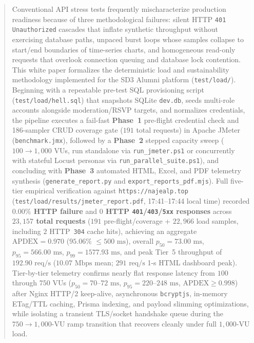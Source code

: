 \documentclass[11pt,letterpaper]{article}
\begin{document}
\begin{abstract}
\noindent Conventional API stress tests frequently mischaracterize production readiness because of three methodological failures: silent HTTP \texttt{401 Unauthorized} cascades that inflate synthetic throughput without exercising database paths, unpaced burst loops whose samples collapse to start/end boundaries of time-series charts, and homogeneous read-only requests that overlook connection queuing and database lock contention. This white paper formalizes the deterministic load and sustainability methodology implemented for the SD3 Alumni platform (\texttt{test/load/}). Beginning with a repeatable pre-test SQL provisioning script (\texttt{test/load/hell.sql}) that snapshots SQLite \texttt{dev.db}, seeds multi-role accounts alongside moderation/RSVP targets, and normalizes credentials, the pipeline executes a fail-fast \textbf{Phase~1} pre-flight credential check and 186-sampler CRUD coverage gate ($191$ total requests) in Apache JMeter (\texttt{benchmark.jmx}), followed by a \textbf{Phase~2} stepped capacity sweep ($100\to 1{,}000$ VUs, run standalone via \texttt{run\_jmeter.ps1} or concurrently with stateful Locust personas via \texttt{run\_parallel\_suite.ps1}), and concluding with \textbf{Phase~3} automated HTML, Excel, and PDF telemetry synthesis (\texttt{generate\_report.py} and \texttt{export\_reports\_pdf.mjs}). Full five-tier empirical verification against \texttt{https://najealp.top} (\texttt{test/load/results/jmeter\_report.pdf}, 17:41--17:44 local time) recorded \textbf{$0.00\%$ HTTP failure} and \textbf{$0$ HTTP \texttt{401}/\texttt{403}/\texttt{5xx} responses} across \textbf{$23{,}157$ total requests} ($191$ pre-flight/coverage + $22{,}966$ load samples, including $2$ HTTP~\texttt{304} cache hits), achieving an aggregate \textbf{$\text{APDEX} = 0.970$} ($95.06\%$ $\le 500\text{ ms}$), overall $p_{50} = 73.00\text{ ms}$, $p_{95} = 566.00\text{ ms}$, $p_{99} = 1577.93\text{ ms}$, and peak Tier~5 throughput of $192.90\text{ req/s}$ ($10.07\text{ Mbps}$ mean; $291\text{ req/s}$ 1-s HTML dashboard peak). Tier-by-tier telemetry confirms nearly flat response latency from $100$ through $750$ VUs ($p_{50} = 70\text{--}72\text{ ms}$, $p_{95} = 220\text{--}248\text{ ms}$, $\text{APDEX} \ge 0.998$) after Nginx HTTP/2 keep-alive, asynchronous \texttt{bcryptjs}, in-memory ETag/TTL caching, Prisma indexing, and payload slimming optimizations, while isolating a transient TLS/socket handshake queue during the $750\to 1{,}000$-VU ramp transition that recovers cleanly under full $1{,}000$-VU load.
\end{abstract}
\end{document}
